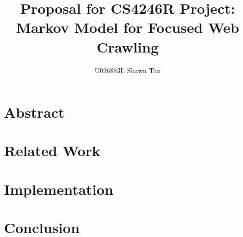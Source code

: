 \documentclass{article}
\title{Proposal for CS4246R Project:\\Markov Model for Focused Web Crawling}
\author{U096883L Shawn Tan}
\begin{document}
\maketitle
\section{Abstract}
\section{Related Work}
\section{Implementation}
\section{Conclusion}
\end{document}
